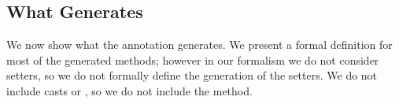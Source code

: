 \subsection{What  \mixin Generates}
We now show what the \mixin annotation generates. We present a formal definition for
most of the generated methods; however in our formalism we do not consider setters, so we do not formally define the generation of the setters. 
We do not include casts or \Q@instanceof@, so we do not include the \Q@with@ method.

